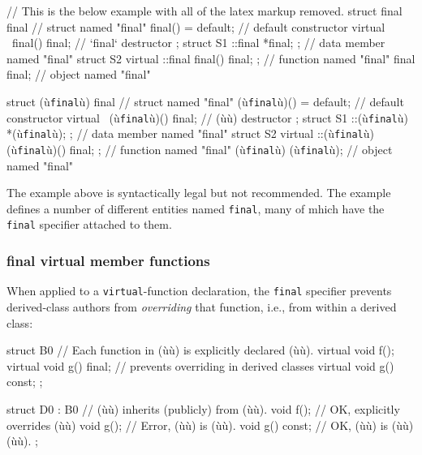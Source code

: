 \begin{emcppshiddenlisting}
// This is the below example with all of the latex markup removed.
struct final final                             // struct named "final"
{
    final() = default;                         // default constructor
    virtual ~final() final;                    // `final` destructor
};          
struct S1 { ::final *final; };                 // data member named "final"
struct S2 { virtual ::final final() final; };  // function named "final"
final final;                                   // object named "final" 
\end{emcppshiddenlisting}
\begin{emcppslisting}[emcppsignore={too much markup, checked above}]
struct (ù{\texttt{final}}ù) final                             // struct named "final"
{
    (ù{\texttt{final}}ù)() = default;                         // default constructor
    virtual ~(ù{\texttt{final}}ù)() final;                    // (ù{}ù) destructor
};          
struct S1 { ::(ù{\texttt{final}}ù) *(ù{\texttt{final}}ù); };                 // data member named "final"
struct S2 { virtual ::(ù{\texttt{final}}ù) (ù{\texttt{final}}ù)() final; };  // function named "final"
(ù{\texttt{final}}ù) (ù{\texttt{final}}ù);                                   // object named "final" 
\end{emcppslisting}
    

\noindent The example above is syntactically legal but not recommended. The
example defines a number of different entities named \texttt{final}, %
many of mhich have the \lstinline!final! specifier attached to them.

\subsubsection[\lstinline!final! virtual member functions]{{\SubsubsecCode final} virtual member functions}\label{final-virtual-member-functions}

When applied to a \lstinline!virtual!-function declaration, the
\lstinline!final! specifier prevents derived-class authors from
\emph{overriding} that function, i.e., from within a derived class:

\begin{emcppslisting}[emcppsbatch=e1]
struct B0  // Each function in (ù{}ù) is explicitly declared (ù{}ù).
{
    virtual void f();
    virtual void g() final;  // prevents overriding in derived classes
    virtual void g() const;
};

struct D0 : B0       // (ù{}ù) inherits (publicly) from (ù{}ù).
{
    void f();        // OK, explicitly overrides (ù{}ù)
    void g();        // Error, (ù{}ù) is (ù{}ù).
    void g() const;  // OK, (ù{}ù) is (ù{}ù) (ù{}ù).
};
\end{emcppslisting}
    

